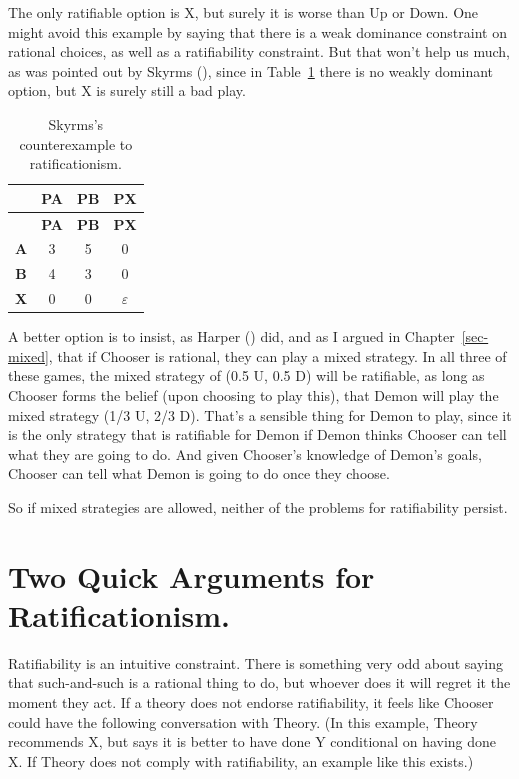 \documentclass[
  12pt,
  letterpaper,
  DIV=11,
  numbers=noendperiod]{scrreprt}
\begin{document}
The only ratifiable option is X, but surely it is worse than Up or Down.
One might avoid this example by saying that there is a weak dominance
constraint on rational choices, as well as a ratifiability constraint.
But that won't help us much, as was pointed out by Skyrms
(), since in
Table~\ref{tbl-verybad-third} there is no weakly dominant option, but X
is surely still a bad play.

\begin{longtable}[]{@{}cccc@{}}
\caption{Skyrms's counterexample to
ratificationism.}\label{tbl-verybad-third}\tabularnewline
\toprule\noalign{}
& \textbf{PA} & \textbf{PB} & \textbf{PX} \\
\midrule\noalign{}
\endfirsthead
\toprule\noalign{}
& \textbf{PA} & \textbf{PB} & \textbf{PX} \\
\midrule\noalign{}
\endhead
\bottomrule\noalign{}
\endlastfoot
\textbf{A} & 3 & 5 & 0 \\
\textbf{B} & 4 & 3 & 0 \\
\textbf{X} & 0 & 0 & \(\varepsilon\) \\
\end{longtable}

A better option is to insist, as Harper
() did, and as I argued in
Chapter~\ref{sec-mixed}, that if Chooser is rational, they can play a
mixed strategy. In all three of these games, the mixed strategy of (0.5
U, 0.5 D) will be ratifiable, as long as Chooser forms the belief (upon
choosing to play this), that Demon will play the mixed strategy (1/3 U,
2/3 D). That's a sensible thing for Demon to play, since it is the only
strategy that is ratifiable for Demon if Demon thinks Chooser can tell
what they are going to do. And given Chooser's knowledge of Demon's
goals, Chooser can tell what Demon is going to do once they choose.

So if mixed strategies are allowed, neither of the problems for
ratifiability persist.

\section{Two Quick Arguments for
Ratificationism.}\label{two-quick-arguments-for-ratificationism.}

Ratifiability is an intuitive constraint. There is something very odd
about saying that such-and-such is a rational thing to do, but whoever
does it will regret it the moment they act. If a theory does not endorse
ratifiability, it feels like Chooser could have the following
conversation with Theory. (In this example, Theory recommends X, but
says it is better to have done Y conditional on having done X. If Theory
does not comply with ratifiability, an example like this exists.)
\end{document}
